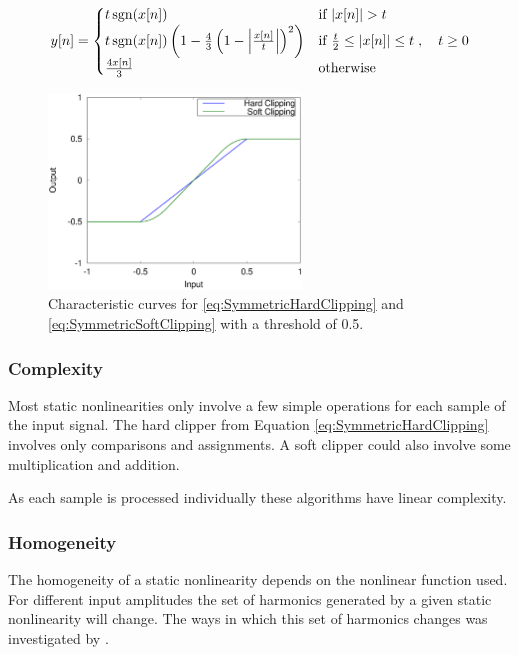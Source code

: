 		\begin{equation}
			y[n] = \begin{cases}
				t\operatorname{sgn}(x[n]) & \text{if $|x[n]| > t$} \\
				t\operatorname{sgn}(x[n]) \left( 1 - \frac{4}{3} \left( 1 - \left| \frac{x[n]}{t} \right| \right)^{2}
					\right) & \text{if $\frac{t}{2} \leq |x[n]| \leq t$} \\
				\frac{4x[n]}{3} & \text{otherwise}
			\end{cases}, \quad t \geq 0
			\label{eq:SymmetricSoftClipping}
		\end{equation}

		\begin{figure}[h!]
			\centering
			\includegraphics[width=0.6\textwidth]{chapter3/Images/Clipping.eps}
			\caption{Characteristic curves for \ref{eq:SymmetricHardClipping} and
				 \ref{eq:SymmetricSoftClipping} with a threshold of 0.5.}
			\label{fig:Clipping}
		\end{figure}

		\subsubsection*{Complexity}
			Most static nonlinearities only involve a few simple operations for each sample of the input
			signal. The hard clipper from Equation \ref{eq:SymmetricHardClipping} involves only comparisons and
			assignments. A soft clipper could also involve some multiplication and addition.
			
			As each sample is processed individually these algorithms have linear complexity.

		\subsubsection*{Homogeneity}
			The homogeneity of a static nonlinearity depends on the nonlinear function used. For different
			input amplitudes the set of harmonics generated by a given static nonlinearity will change. The
			ways in which this set of harmonics changes was investigated by \citet{enderby2012harmonic}.

